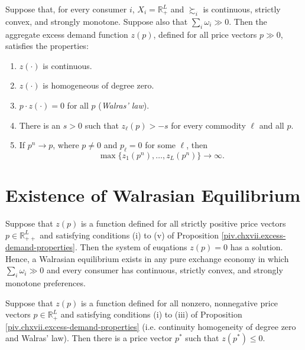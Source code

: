 \begin{prop}\label{piv.chxvii.excess-demand-properties}
    Suppose that, for every consumer $i$, $X_i = \mathbb{R}^L_+$ and $\succsim_i$ is continuous, strictly convex, and strongly monotone. Suppose also that $\sum_i \omega_i \gg 0$. Then the aggregate excess demand function $z(p)$, defined for all price vectors $p \gg 0$, satisfies the properties:
    \begin{enumerate}
        \item $z(\cdot)$ is continuous.
        \item $z(\cdot)$ is homogeneous of degree zero.
        \item $p \cdot z(\cdot) = 0$ for all $p$ (\emph{Walras' law}).
        \item There is an $s > 0$ such that $z_\ell(p) > -s$ for every commodity $\ell$ and all $p$.
        \item
        If $p^n \rightarrow p$, where $p \neq 0$ and $p_\ell = 0$ for some $\ell$, then
        \begin{equation*}
            \max \{z_1(p^n), \dots, z_L(p^n)\} \rightarrow \infty.
        \end{equation*}
    \end{enumerate}
\end{prop}


\section{Existence of Walrasian Equilibrium}

\begin{prop}
    Suppose that $z(p)$ is a function defined for all strictly positive price vectors $p \in \mathbb{R}^L_{++}$ and satisfying conditions (i) to (v) of Proposition \ref{piv.chxvii.excess-demand-properties}. Then the system of euqations $z(p) = 0$ has a solution. Hence, a Walrasian equilibrium exists in any pure exchange economy in which $\sum_i \omega_i \gg 0$ and every consumer has continuous, strictly convex, and strongly monotone preferences.
\end{prop}

\begin{prop}
    Suppose that $z(p)$ is a function defined for all nonzero, nonnegative price vectors $p \in \mathbb{R}^L_+$ and satisfying conditions (i) to (iii) of Proposition \ref{piv.chxvii.excess-demand-properties} (i.e. continuity homogeneity of degree zero and Walras' law). Then there is a price vector $p^*$ such that $z(p^*) \leq 0$.
\end{prop}


